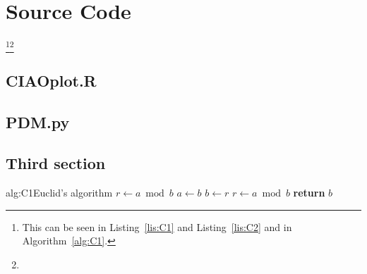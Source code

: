 \chapter{Source Code}
\lipsum[10-11]\footnote{This can be seen in Listing~\ref{lis:C1} and Listing~\ref{lis:C2} and in Algorithm~\ref{alg:C1}.}\footnote{\lipsum[12]}
\section{CIAOplot.R}
\section{PDM.py}
\section{Third section}
\lipsum[6]
\begin{singlealgorithm}{alg:C1}{Euclid's algorithm}
   
  \State $r\gets a \bmod b$
   
  \State $a \gets b$
  \State $b \gets r$
  \State $r \gets a \bmod b$
  \EndWhile
  \State \textbf{return} $b$
  \EndProcedure
\end{singlealgorithm}
\lipsum[6]
